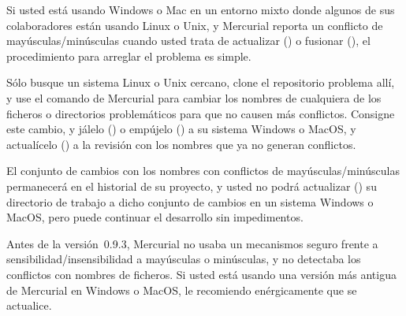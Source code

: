 Si usted está usando Windows o Mac en un entorno mixto donde algunos
de sus colaboradores están usando Linux o Unix, y Mercurial reporta un
conflicto de mayúsculas/minúsculas cuando usted trata de actualizar
() o fusionar (), el procedimiento para
arreglar el problema es simple.

Sólo busque un sistema Linux o Unix cercano, clone el repositorio
problema allí, y use el comando  de Mercurial para
cambiar los nombres de cualquiera de los ficheros o directorios
problemáticos para que no causen más conflictos. Consigne este cambio,
y jálelo () o empújelo () a su sistema Windows
o MacOS, y actualícelo () a la revisión con los nombres
que ya no generan conflictos.

El conjunto de cambios con los nombres con conflictos de
mayúsculas/minúsculas permanecerá en el historial de su proyecto, y
usted no podrá actualizar () su directorio de trabajo a
dicho conjunto de cambios en un sistema Windows o MacOS, pero puede
continuar el desarrollo sin impedimentos.

\begin{note}
  Antes de la versión~0.9.3, Mercurial no usaba un mecanismos seguro
  frente a sensibilidad/insensibilidad a mayúsculas o minúsculas, y no
  detectaba los conflictos con nombres de ficheros. Si usted está
  usando una versión más antigua de Mercurial en Windows o MacOS, le
  recomiendo enérgicamente que se actualice.
\end{note}

